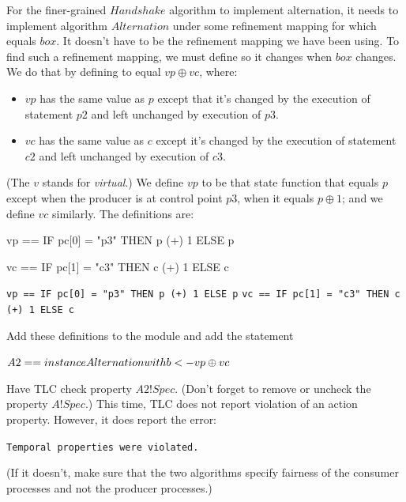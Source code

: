\documentclass[fleqn,leqno]{article}
\begin{document}
For the finer-grained $Handshake$ algorithm to implement alternation,
it needs to implement algorithm $Alternation$ under some refinement
mapping for which  equals $box$.  It doesn't have to be the
refinement mapping we have been using.  To find such a refinement
mapping, we must define  so it changes when $box$ changes.
We do that by defining  to equal $vp\oplus vc$, where:
\begin{itemize}
\item[] $vp$ has the same value as $p$ except that it's changed by the 
        execution of statement $p2$ and left unchanged by execution of $p3$.

\item[] $vc$ has the same value as $c$ except it's changed by the 
        execution of statement $c2$ and left unchanged by execution of $c3$.
\end{itemize}
(The $v$ stands for \emph{virtual}.)  We define $vp$ to be that state
function that equals $p$ except when the producer is at control point
$p3$, when it equals $p\oplus 1$; and we define $vc$ similarly.  The
definitions are:
\smallskip
\begin{twocols}[.475]
\begin{notla}
vp == IF pc[0] = "p3" THEN p (+) 1 ELSE p

vc == IF pc[1] = "c3" THEN c (+) 1 ELSE c
\end{notla}
\begin{tlatex}
\@pvspace{4.0pt}%
\end{tlatex}
\midcol
\verb|vp == IF pc[0] = "p3" THEN p (+) 1 ELSE p|
\verb|vc == IF pc[1] = "c3" THEN c (+) 1 ELSE c|
\end{twocols}
\smallskip
Add these definitions to the module and add the statement
\begin{display}
$A2 == \INSTANCE Alternation \WITH b <- vp \oplus vc$
\end{display}
Have TLC check property $A2!Spec$.  (Don't forget to remove or uncheck
the property $A!Spec$.)  This time, TLC does not report violation of
an action property.  However, it does report the error:
\begin{display}
\tt Temporal properties were violated.
\end{display}
(If it doesn't, make sure that the two algorithms specify fairness of
the consumer processes and not the producer processes.)
\end{document}
